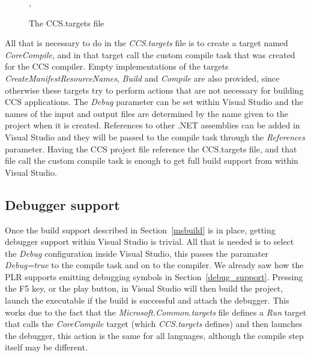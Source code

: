 	\begin{figure}
\caption{The CCS.targets file}
\label{fig:ccstargets},
\end{figure}
	
	All that is necessary to do in the \textit{CCS.targets} file is to create a 
	target named \textit{CoreCompile}, and in that target call the custom 
	compile task that was created for the CCS compiler. Empty implementations of 
	the targets \textit{CreateManifestResourceNames}, \textit{Build} and 
	\textit{Compile} are also provided, since otherwise these targets try to 
	perform actions that are not necessary for building CCS applications. The 
	\textit{Debug} parameter can be set within Visual Studio and the names of 
	the input and output files are determined by the name given to the project 
	when it is created. References to other .NET assemblies can be added in 
	Visual Studio and they will be passed to the compile task through the 
	\textit{References} parameter. Having the CCS project file reference the 
	CCS.targets file, and that file call the custom compile task is enough to 
	get full build support from within Visual Studio.
	
	\subsection{Debugger support}
	
	Once the build support described in Section~\ref{msbuild} is in place, 
	getting debugger support within Visual Studio is trivial. All that is needed 
	is to select the \textit{Debug} configuration inside Visual Studio, this 
	passes the paramater \textit{Debug=true} to the compile task and on to the 
	compiler. We already saw how the PLR supports emitting debugging symbols in 
	Section~\ref{debug_support}. Pressing the F5 key, or the play button, in 
	Visual Studio will then build the project, launch the executable if the 
	build is successful and attach the debugger. This works due to the fact that 
	the \textit{Microsoft.Common.targets} file defines a \textit{Run} target 
	that calls the \textit{CoreCompile} target (which \textit{CCS.targets} 
	defines) and then launches the debugger, this action is the same for all 
	languages, although the compile step itself may be different.
	
